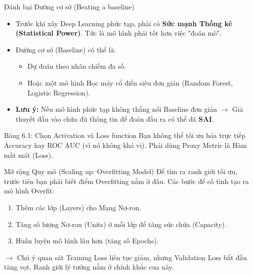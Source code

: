 \documentclass[aspectratio=169]{beamer}
\begin{document}
\begin{frame}{Đánh bại Đường cơ sở (Beating a baseline)}
    \begin{itemize}
        \item Trước khi xây Deep Learning phức tạp, phải có \textbf{Sức mạnh Thống kê (Statistical Power)}. Tức là mô hình phải tốt hơn việc "đoán mò".
        \item Đường cơ sở (Baseline) có thể là:
        \begin{itemize}
            \item Dự đoán theo nhãn chiếm đa số.
            \item Hoặc một mô hình Học máy cổ điển siêu đơn giản (Random Forest, Logistic Regression).
        \end{itemize}
        \item \textbf{Lưu ý:} Nếu mô hình phức tạp không thắng nổi Baseline đơn giản $\rightarrow$ Giả thuyết đầu vào chứa đủ thông tin để đoán đầu ra có thể đã \textbf{SAI}.
    \end{itemize}
\end{frame}

\begin{frame}{Bảng 6.1: Chọn Activation và Loss function}
    Bạn không thể tối ưu hóa trực tiếp Accuracy hay ROC AUC (vì nó không khả vi). Phải dùng Proxy Metric là Hàm mất mát (Loss).
    
    \vspace{0.5cm}
\end{frame}

\begin{frame}{Mở rộng Quy mô (Scaling up: Overfitting Model)}
    Để tìm ra ranh giới tối ưu, trước tiên bạn phải biết điểm Overfitting nằm ở đâu. Các bước để cố tình tạo ra mô hình Overfit:
    \begin{enumerate}
        \item Thêm các lớp (Layers) cho Mạng Nơ-ron.
        \item Tăng số lượng Nơ-ron (Units) ở mỗi lớp để tăng sức chứa (Capacity).
        \item Huấn luyện mô hình lâu hơn (tăng số Epochs).
    \end{enumerate}
    $\rightarrow$ Chú ý quan sát Training Loss liên tục giảm, nhưng Validation Loss bắt đầu tăng vọt. Ranh giới lý tưởng nằm ở chính khúc cua này.
\end{frame}
\end{document}
